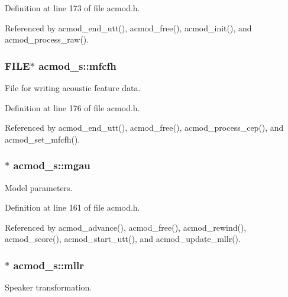 Definition at line 173 of file acmod.\-h.



Referenced by acmod\-\_\-end\-\_\-utt(), acmod\-\_\-free(), acmod\-\_\-init(), and acmod\-\_\-process\-\_\-raw().

\subsubsection[{mfcfh}]{\setlength{\rightskip}{0pt plus 5cm}F\-I\-L\-E$\ast$ acmod\-\_\-s\-::mfcfh}\label{structacmod__s_a71903df6839f1f9fcfc2ef2a62a94f8e}


File for writing acoustic feature data. 



Definition at line 176 of file acmod.\-h.



Referenced by acmod\-\_\-end\-\_\-utt(), acmod\-\_\-free(), acmod\-\_\-process\-\_\-cep(), and acmod\-\_\-set\-\_\-mfcfh().

\subsubsection[{mgau}]{$\ast$ acmod\-\_\-s\-::mgau}\label{structacmod__s_a023addd9fe7252d87c683e02485cdafd}


Model parameters. 



Definition at line 161 of file acmod.\-h.



Referenced by acmod\-\_\-advance(), acmod\-\_\-free(), acmod\-\_\-rewind(), acmod\-\_\-score(), acmod\-\_\-start\-\_\-utt(), and acmod\-\_\-update\-\_\-mllr().

\subsubsection[{mllr}]{$\ast$ acmod\-\_\-s\-::mllr}\label{structacmod__s_a4edbfa1a1324c6db27b74de7d0158e5e}


Speaker transformation. 



